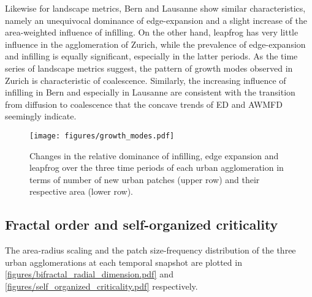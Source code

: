 \documentclass[10pt,letterpaper]{article}
\begin{document}
Likewise for landscape metrics, Bern and Lausanne show similar characteristics, namely an unequivocal dominance of edge-expansion and a slight increase of the area-weighted influence of infilling.
On the other hand, leapfrog has very little influence in the agglomeration of Zurich, while the prevalence of edge-expansion and infilling is equally significant, especially in the latter periods.
As the time series of landscape metrics suggest, the pattern of growth modes observed in Zurich is characteristic of coalescence.
Similarly, the increasing influence of infilling in Bern and especially in Lausanne are consistent with the transition from diffusion to coalescence that the concave trends of ED and AWMFD seemingly indicate.

\begin{figure}[ht]
  \begin{adjustwidth}{-.4\textwidth}{0cm}
    \centering  
    \texttt{[image: figures/growth\_modes.pdf]}
    \vspace{.5em}
    \caption[Three growth modes]{\label{figures/growth_modes.pdf}Changes in the relative dominance of infilling, edge expansion and leapfrog over the three time periods of each urban agglomeration in terms of number of new urban patches (upper row) and their respective area (lower row).}
  \end{adjustwidth}
\end{figure}


\subsection*{Fractal order and self-organized criticality}

The area-radius scaling and the patch size-frequency distribution of the three urban agglomerations at each temporal snapshot are plotted in \autoref{figures/bifractal_radial_dimension.pdf} and \autoref{figures/self_organized_criticality.pdf} respectively.
\end{document}
